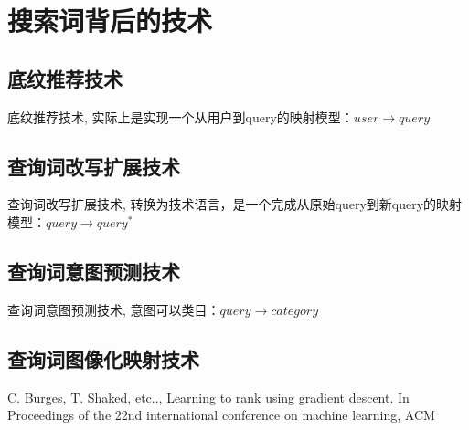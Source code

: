 
\chapter{搜索词背后的技术}
\thispagestyle{empty}

\setlength{\fboxrule}{0pt}\setlength{\fboxsep}{0cm}
\noindent\shadowbox{
\begin{tcolorbox}[arc=0mm,colback=lightblue,colframe=darkblue,title=学习目标与要求]

\end{tcolorbox}}
\setlength{\fboxrule}{1pt}\setlength{\fboxsep}{4pt} 


\section{底纹推荐技术} 
	底纹推荐技术, 实际上是实现一个从用户到query的映射模型：$user \to query$

\section{查询词改写扩展技术}
	查询词改写扩展技术, 转换为技术语言，是一个完成从原始query到新query的映射模型：$query \to query^*$
\section{查询词意图预测技术}
查询词意图预测技术, 意图可以类目：$query \to category$


\section{查询词图像化映射技术} 


\begin{thebibliography}{99}
 C. Burges, T. Shaked, etc.., Learning to rank 
using gradient descent. In Proceedings of the 22nd international 
conference on machine learning, ACM
\end{thebibliography}

 
